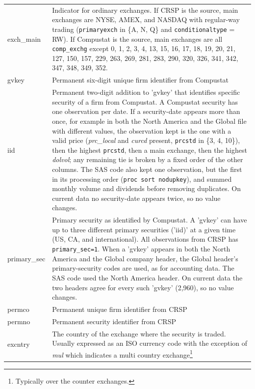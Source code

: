 \documentclass[12pt,title,fleqn]{article}
\begin{document}
{\begin{longtable}{@{\extracolsep{\fill}}|l|m{14.2cm}|@{}}
		exch\_main & Indicator for ordinary exchanges. If CRSP is the source, main exchanges are NYSE, AMEX, and NASDAQ with regular-way trading (\texttt{primaryexch} in \{A, N, Q\} and \texttt{conditionaltype} = RW). If Compustat is the source, main exchanges are all \texttt{comp\_exchg} except 0, 1, 2, 3, 4, 13, 15, 16, 17, 18, 19, 20, 21, 127, 150, 157, 229, 263, 269, 281, 283, 290, 320, 326, 341, 342, 347, 348, 349, 352.  \\[1ex]
		
		gvkey & Permanent six-digit unique firm identifier from Compustat\\[1ex]
		
		iid & Permanent two-digit addition to 'gvkey' that identifies specific security of a firm from Compustat. A Compustat security has one observation per date. If a security-date appears more than once, for example in both the North America and the Global file with different values, the observation kept is the one with a valid price (\textit{prc\_local} and \textit{curcd} present, \texttt{prcstd} in \{3, 4, 10\}), then the highest \texttt{prcstd}, then a main exchange, then the highest \textit{dolvol}; any remaining tie is broken by a fixed order of the other columns. The SAS code also kept one observation, but the first in its processing order (\texttt{proc sort nodupkey}), and summed monthly volume and dividends before removing duplicates. On current data no security-date appears twice, so no value changes.\\[1ex]
		
		primary\_sec &  Primary security as identified by Compustat. A 'gvkey' can have up to three different primary securities ('iid)' at a given time (US, CA, and international). All observations from CRSP has \texttt{primary\_sec=1}. When a 'gvkey' appears in both the North America and the Global company header, the Global header's primary-security codes are used, as for accounting data. The SAS code used the North America header. On current data the two headers agree for every such 'gvkey' (2,960), so no value changes.  \\[1ex]
		
		permco & Permanent unique firm identifier from CRSP\\[1ex]
		
		permno & Permanent security identifier from CRSP\\[1ex]
		
		excntry & The country of the exchange where the security is traded. Usually expressed as an ISO currency code with the exception of \textit{mul} which indicates a multi country exchange\footnote{Typically over the counter exchanges.}\\[1ex]
		

\end{longtable}}
\end{document}

